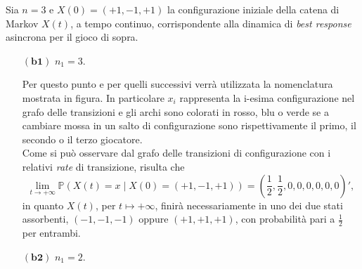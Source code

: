 \documentclass[11pt,largemargins]{homework}
\begin{document}
\begin{alphaparts}
  
  
  \newpage
  \questionpart
  Sia $n=3$ e $X\left(0\right)=\left(+1,-1,+1\right)$ la configurazione iniziale della catena di Markov $X\left(t\right)$, a tempo continuo, corrispondente alla dinamica di \emph{best response} asincrona per il gioco di sopra. \\
  \begin{itemize}
  
 \item[$\left(\textbf{b1}\right)$] $n_{1}=3$. 
 
 
 Per questo punto e per quelli successivi verrà utilizzata la nomenclatura mostrata in figura. In particolare \(x_i\) rappresenta la i-esima configurazione nel grafo delle transizioni e gli archi sono colorati in rosso, blu o verde se a cambiare mossa in un salto di configurazione sono rispettivamente il primo, il secondo o il terzo giocatore.  \\

  Come si può osservare dal grafo delle transizioni di configurazione con i relativi \emph{rate} di transizione, risulta che
  \begin{equation*}
  \lim\limits_{t \rightarrow +\infty}\mathbb{P}\left(X\left(t\right)=x\mid X\left(0\right)=\left(+1,-1,+1\right)\right)=\left(\frac{1}{2},\frac{1}{2},0,0,0,0,0,0\right)',
\end{equation*}
in quanto $X\left(t\right)$, per $t\mapsto +\infty$, finirà necessariamente in uno dei due stati assorbenti, $\left(-1,-1,-1\right)$ oppure $\left(+1,+1,+1\right)$, con probabilità pari a $\frac{1}{2}$ per entrambi.

\newpage
   \item[$\left(\textbf{b2}\right)$] $n_{1}=2$. 
 
 
  

\end{itemize}
\end{alphaparts}
\end{document}
